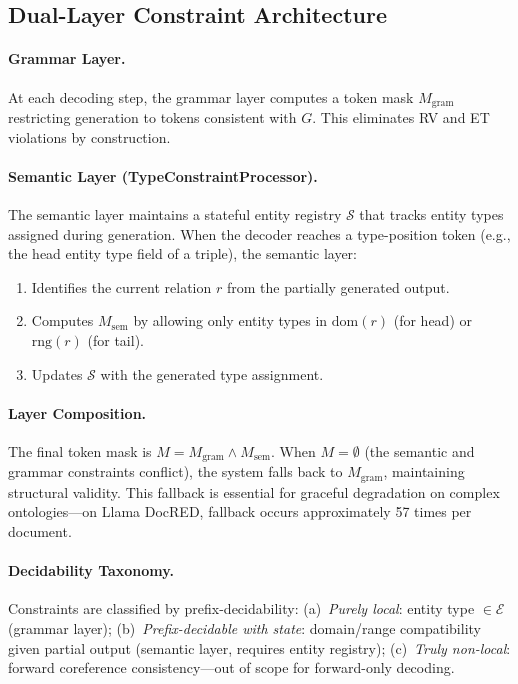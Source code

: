\documentclass[11pt,a4paper]{article}
\begin{document}
\subsection{Dual-Layer Constraint Architecture}

\paragraph{Grammar Layer.}
At each decoding step, the grammar layer computes a token mask $M_{\text{gram}}$ restricting generation to tokens consistent with $G$. This eliminates RV and ET violations by construction.

\paragraph{Semantic Layer (TypeConstraintProcessor).}
The semantic layer maintains a stateful entity registry $\mathcal{S}$ that tracks entity types assigned during generation. When the decoder reaches a type-position token (e.g., the head entity type field of a triple), the semantic layer:
\begin{enumerate}
    \item Identifies the current relation $r$ from the partially generated output.
    \item Computes $M_{\text{sem}}$ by allowing only entity types in $\text{dom}(r)$ (for head) or $\text{rng}(r)$ (for tail).
    \item Updates $\mathcal{S}$ with the generated type assignment.
\end{enumerate}

\paragraph{Layer Composition.}
The final token mask is $M = M_{\text{gram}} \wedge M_{\text{sem}}$. When $M = \emptyset$ (the semantic and grammar constraints conflict), the system falls back to $M_{\text{gram}}$, maintaining structural validity. This fallback is essential for graceful degradation on complex ontologies---on Llama DocRED, fallback occurs approximately 57 times per document.

\paragraph{Decidability Taxonomy.}
Constraints are classified by prefix-decidability:
(a)~\emph{Purely local}: entity type $\in \mathcal{E}$ (grammar layer);
(b)~\emph{Prefix-decidable with state}: domain/range compatibility given partial output (semantic layer, requires entity registry);
(c)~\emph{Truly non-local}: forward coreference consistency---out of scope for forward-only decoding.
\end{document}
